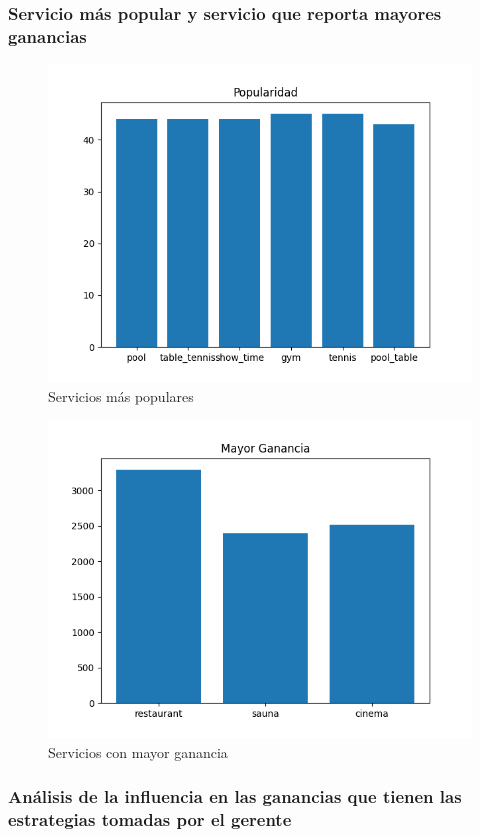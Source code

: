 \documentclass[12pt,a4paper]{article} \usepackage[spanish]{babel} \usepackage{graphicx} \usepackage{amsmath} \usepackage{amsfonts} \usepackage{amssymb} \usepackage{float} \usepackage{geometry}
\begin{document}
\subsubsection{Servicio más popular y servicio que reporta mayores ganancias}
\begin{figure}[H] \centering \includegraphics[width=\textwidth]{Popularidad serv} \caption{Servicios más populares} \label{fig:etiqueta} \end{figure}
\begin{figure}[H] \centering \includegraphics[width=\textwidth]{Mayor Ganancia} \caption{Servicios con mayor ganancia} \label{fig:etiqueta} \end{figure}
\subsubsection{Análisis de la influencia en las ganancias que tienen las estrategias tomadas por el gerente}
\end{document}
